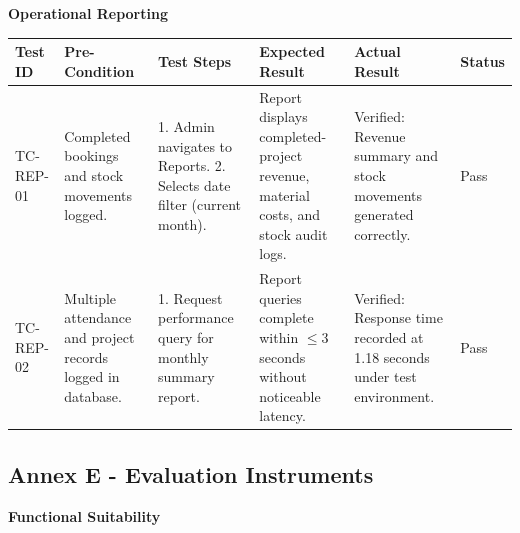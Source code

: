 \documentclass[12pt, letterpaper]{article}
\begin{document}
\begin{landscape}

    

\begin{center}\textbf{Operational Reporting}\end{center}
\centering

\begin{tabular}{p{2.2cm} p{3.8cm} p{5cm} p{5cm} p{3.5cm} p{1.5cm}}
\toprule
\textbf{Test ID} & \textbf{Pre-Condition} & \textbf{Test Steps} & \textbf{Expected Result} & \textbf{Actual Result} & \textbf{Status} \\
\midrule
TC-REP-01 & Completed bookings and stock movements logged. & 1. Admin navigates to Reports. 2. Selects date filter (current month). & Report displays completed-project revenue, material costs, and stock audit logs. & Verified: Revenue summary and stock movements generated correctly. & Pass \\
TC-REP-02 & Multiple attendance and project records logged in database. & 1. Request performance query for monthly summary report. & Report queries complete within $\le 3$ seconds without noticeable latency. & Verified: Response time recorded at 1.18 seconds under test environment. & Pass \\
\bottomrule
\end{tabular}


\end{landscape}

\clearpage

\newpage
\subsection*{Annex E - Evaluation Instruments}


    

\begin{center}\textbf{Functional Suitability}\end{center}
\centering
\end{document}
